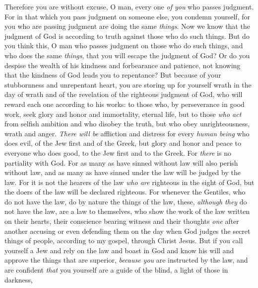 \begin{biblechapter} %
 Therefore you are without excuse, O man, every one \textit{of you} who passes judgment. For in that which you pass judgment on someone else, you condemn yourself, for you who are passing judgment are doing the same \textit{things}.
\verse Now we know that the judgment of God is according to truth against those who do such things.
\verse But do you think this, O man who passes judgment on those who do such things, and who does the same \textit{things}, that you will escape the judgment of God?
\verse Or do you despise the wealth of his kindness and forbearance and patience, not knowing that the kindness of God leads you to repentance?
\verse But because of your stubbornness and unrepentant heart, you are storing up for yourself wrath in the day of wrath and of the revelation of the righteous judgment of God,
\verse who will reward each one according to his works:
\verse to those who, by perseverance in good work, seek glory and honor and immortality, eternal life,
\verse but to those \textit{who act} from selfish ambition and who disobey the truth, but who obey unrighteousness, wrath and anger.
\verse \textit{There will be} affliction and distress for every \textit{human being} who does evil, of the Jew first and of the Greek,
\verse but glory and honor and peace to everyone who does good, to the Jew first and to the Greek.
\verse For \textit{there} is no partiality with God.
\verse For as many as have sinned without law will also perish without law, and as many as have sinned under the law will be judged by the law.
\verse For it is not the hearers of the law \textit{who are} righteous in the sight of God, but the doers of the law will be declared righteous.
\verse For whenever the Gentiles, who do not have the law, do by nature the things of the law, these, \textit{although they} do not have the law, are a law to themselves,
\verse who show the work of the law written on their hearts, their conscience bearing witness and their thoughts \textit{one} after another accusing or even defending them
\verse on the day when God judges the secret things of people, according to my gospel, through Christ Jesus.
 But if you call yourself a Jew and rely on the law and boast in God
\verse and know his will and approve the things that are superior, \textit{because you} are instructed by the law,
\verse and are confident \textit{that} you yourself are a guide of the blind, a light of those in darkness,

\end{biblechapter}
